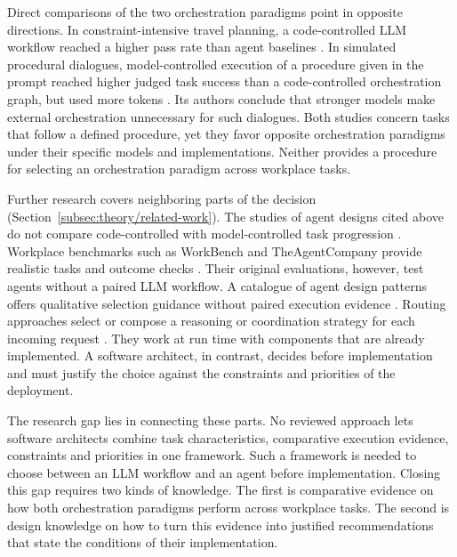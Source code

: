 Direct comparisons of the two orchestration paradigms point in opposite directions. In constraint-intensive travel planning, a code-controlled LLM workflow reached a higher pass rate than agent baselines \parencite{qiuBlueprintFirstModel2025}. In simulated procedural dialogues, model-controlled execution of a procedure given in the prompt reached higher judged task success than a code-controlled orchestration graph, but used more tokens \parencite{dennisInContextPromptingObsoletes2026}. Its authors conclude that stronger models make external orchestration unnecessary for such dialogues. Both studies concern tasks that follow a defined procedure, yet they favor opposite orchestration paradigms under their specific models and implementations. Neither provides a procedure for selecting an orchestration paradigm across workplace tasks.
 
Further research covers neighboring parts of the decision (Section~\ref{subsec:theory/related-work}). The studies of agent designs cited above do not compare code-controlled with model-controlled task progression \parencite{bogavelliAgentArchComprehensiveBenchmark2025,kimScienceScalingAgent2025}. Workplace benchmarks such as WorkBench and TheAgentCompany provide realistic tasks and outcome checks \parencite{stylesWorkBenchBenchmarkDataset2024,xuTheAgentCompanyBenchmarkingLLM2025}. Their original evaluations, however, test agents without a paired LLM workflow. A catalogue of agent design patterns offers qualitative selection guidance without paired execution evidence \parencite{liuAgentDesignPattern2025}. Routing approaches select or compose a reasoning or coordination strategy for each incoming request \parencite{gaoSingleagentMultiagentSystems2025,suDifficultyAwareAgenticOrchestration2025,zhouSelectthenSolveParadigmRouting2026}. They work at run time with components that are already implemented. A software architect, in contrast, decides before implementation and must justify the choice against the constraints and priorities of the deployment.
 
The research gap lies in connecting these parts. No reviewed approach lets software architects combine task characteristics, comparative execution evidence, constraints and priorities in one framework. Such a framework is needed to choose between an LLM workflow and an agent before implementation. Closing this gap requires two kinds of knowledge. The first is comparative evidence on how both orchestration paradigms perform across workplace tasks. The second is design knowledge on how to turn this evidence into justified recommendations that state the conditions of their implementation.

